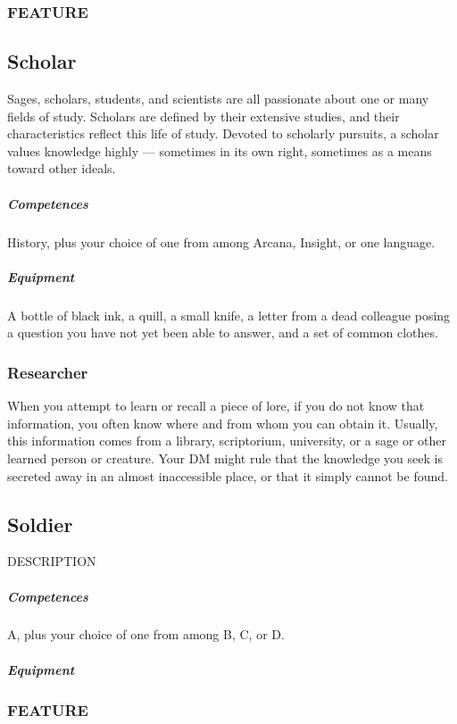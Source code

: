     \subsubsection{FEATURE}

\subsection*{Scholar} \label{ssec::scholar}
    Sages, scholars, students, and scientists are all passionate about one or many fields of study.
    Scholars are defined by their extensive studies, and their characteristics reflect this life of study.
    Devoted to scholarly pursuits, a scholar values knowledge highly --- sometimes in its own right, sometimes as a means toward other ideals.
    \subparagraph{Competences} History, plus your choice of one from among Arcana, Insight, or one language.
    \subparagraph{Equipment} A bottle of black ink, a quill, a small knife, a letter from a dead colleague posing a question you have not yet been able to answer, and a set of common clothes.
    \subsubsection{Researcher} \label{feat::researcher}
        When you attempt to learn or recall a piece of lore, if you do not know that information, you often know where and from whom you can obtain it.
        Usually, this information comes from a library, scriptorium, university, or a sage or other learned person or creature.
        Your DM might rule that the knowledge you seek is secreted away in an almost inaccessible place, or that it simply cannot be found.

\subsection*{Soldier} \label{ssec::soldier}
    DESCRIPTION
    \subparagraph{Competences} A, plus your choice of one from among B, C, or D.
    \subparagraph{Equipment}
    \subsubsection{FEATURE}

